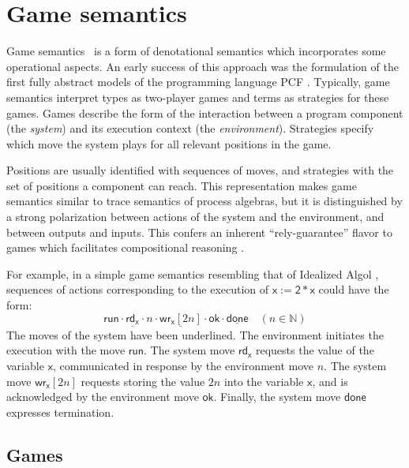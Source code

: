 \documentclass[draft,11pt]{report}
\newcommand{\kw}[1]{\ensuremath{ \mathsf{#1} }}
\begin{document}


\section{Game semantics} %


Game semantics~\citep{gsll,gamesem99}
is a form of denotational semantics which
incorporates some operational aspects.
An early success of this approach was
the formulation of the first fully abstract models
of the programming language PCF \citep{pcfajm,pcfho}.
Typically,
game semantics interpret
types as two-player games
and terms as strategies for these games.
Games describe the form of the interaction
between a program component %
(the \emph{system})
and its execution context
(the \emph{environment}).
Strategies
specify which move the system plays
for all relevant positions in the game.

Positions are usually identified with sequences of moves,
and strategies with the set of positions
a component can reach.
This representation makes
game semantics similar to
trace semantics of process algebras,
but it is distinguished
by a strong polarization between
actions of the system and the environment,
and between outputs and inputs.
This confers an inherent ``rely-guarantee'' flavor
to games which facilitates compositional reasoning
\citep{cspgs}.

For example,
in a simple game semantics resembling that of
Idealized Algol \citep{gsia},
sequences of actions corresponding to
the execution of $\kw{x := 2 * x}$
could have the form:
\[
    \kw{run} \cdot
    \underline{\kw{rd}_\kw{x}} \cdot n \cdot
    \underline{\kw{wr}_\kw{x}[2n]} \cdot \kw{ok} \cdot
    \underline{\kw{done}} \quad (n \in \mathbb{N})
\]
The moves of the system have been underlined.
The environment initiates the execution with
the move $\kw{run}$.
The system move $\kw{rd}_\kw{x}$ requests
the value of the variable $\kw{x}$,
communicated in response by the environment move $n$.
The system move $\kw{wr}_\kw{x}[2n]$ requests
storing the value $2n$ into the variable $\kw{x}$,
and is acknowledged by the environment move $\kw{ok}$.
Finally, the system move $\kw{done}$
expresses termination.


\subsection{Games} \label{sec:mainideas:gs:games} %
\end{document}
